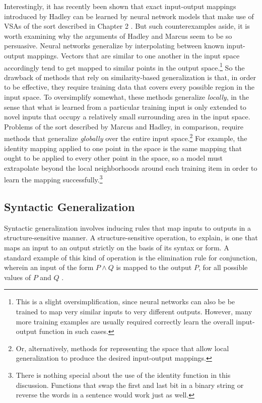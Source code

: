 Interestingly, it has recently been shown that exact input-output mappings introduced by Hadley can be learned by neural network models that make use of VSAs of the sort described in Chapter 2 \citep[][pp. 269-72]{Eliasmith:2013}. But such counterexamples aside, it is worth examining why the arguments of Hadley and Marcus seem to be so persuasive. Neural networks generalize by interpolating between known input-output mappings. Vectors that are similar to one another in the input space accordingly tend to get mapped to similar points in the output space.\footnote{This is a slight oversimplification, since neural networks can also be be trained to map very similar inputs to very different outputs. However, many more training examples are usually required correctly learn the overall input-output function in such cases.} So the drawback of methods that rely on similarity-based generalization is that, in order to be effective, they require training data that covers every possible region in the input space. To oversimplify somewhat, these methods generalize \textit{locally}, in the sense that what is learned from a particular training input is only extended to novel inputs that occupy a relatively small surrounding area in the input space. Problems of the sort described by Marcus and Hadley, in comparison, require methods that generalize \textit{globally} over the entire input space.\footnote{Or, alternatively, methods for representing the space that allow local generalization to produce the desired input-output mappings.} For example, the identity mapping applied to one point in the space is the same mapping that ought to be applied to every other point in the space, so a model must extrapolate beyond the local neighborhoods around each training item in order to learn the mapping successfully.\footnote{There is nothing special about the use of the identity function in this discussion. Functions that swap the first and last bit in a binary string or reverse the words in a sentence would work just as well.}

\subsection{Syntactic Generalization}

Syntactic generalization involves inducing rules that map inputs to outputs in a structure-sensitive manner. A structure-sensitive operation, to explain, is one that maps an input to an output strictly on the basis of its syntax or form. A standard example of this kind of operation is the elimination rule for conjunction, wherein an input of the form $P \land Q$ is mapped to the output $P$, for all possible values of $P$ and $Q$ \citep{FodorPylyshyn:1988}. 

